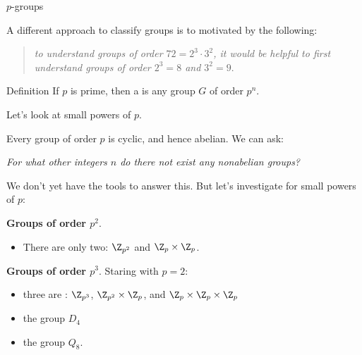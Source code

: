 \documentclass[8pt, handout]{beamer}
\newcommand{\Pause}{}
\begin{document}
\begin{frame}{$p$-groups} %

  A different approach to classify groups is to motivated by the
  following:

  \begin{quote}
    \emph{to understand groups of order $72=2^3\cdot 3^2$, it would
    be helpful to first understand groups of order $2^3=8$ and $3^2=9$}.
  \end{quote}

  \Pause
  
  \begin{block}{Definition}
    If $p$ is prime, then a  is any group $G$ of order $p^n$. 
  \end{block}

  \smallskip\Pause
  
  Let's look at small powers of $p$. \medskip\Pause
  
  Every group of order $p$ is cyclic, and hence abelian. We can ask:
  \begin{center}
    \emph{For what other integers $n$ do there not exist any
      nonabelian groups?}
  \end{center}
  
  \Pause
  
  We don't yet have the tools to answer this. \Pause But let's
  investigate for small powers of $p$: \medskip\Pause
  
  \textbf{Groups of order $p^2$}. \Pause
  \begin{itemize}
  \item There are only two: $\Z_{p^2}$ and $\Z_p\times\Z_p$. \Pause
  \end{itemize}

  \smallskip
  
  \textbf{Groups of order $p^3$}. \Pause Staring with $p=2$: 
  \begin{itemize}
  \item three are : $\Z_{p^3}$,\; $\Z_{p^2}\times\Z_p$, and
    $\Z_p\times\Z_p\times\Z_p$ \Pause
  \item the  group $D_4$ \Pause
  \item the  group $Q_8$. \Pause
  \end{itemize}
  
\end{frame}

\end{document}
